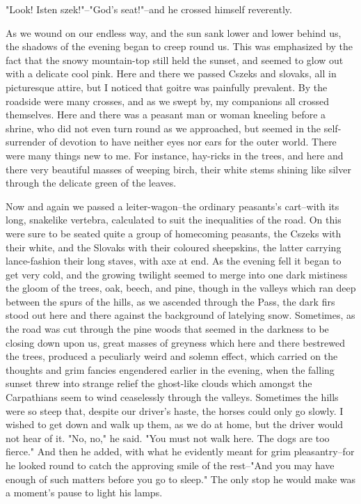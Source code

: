 "Look! Isten szek!"--"God's seat!"--and he crossed himself reverently. 

As we wound on our endless way, and the sun sank lower and lower behind us, the shadows of the evening began to creep round us. This was emphasized by the fact that the snowy mountain-top still held the sunset, and seemed to glow out with a delicate cool pink. Here and there we passed Cszeks and slovaks, all in picturesque attire, but I noticed that goitre was painfully prevalent. By the roadside were many crosses, and as we swept by, my companions all crossed themselves. Here and there was a peasant man or woman kneeling before a shrine, who did not even turn round as we approached, but seemed in the self-surrender of devotion to have neither eyes nor ears for the outer world. There were many things new to me. For instance, hay-ricks in the trees, and here and there very beautiful masses of weeping birch, their white stems shining like silver through the delicate green of the leaves. 

Now and again we passed a leiter-wagon--the ordinary peasants's cart--with its long, snakelike vertebra, calculated to suit the inequalities of the road. On this were sure to be seated quite a group of homecoming peasants, the Cszeks with their white, and the Slovaks with their coloured sheepskins, the latter carrying lance-fashion their long staves, with axe at end. As the evening fell it began to get very cold, and the growing twilight seemed to merge into one dark mistiness the gloom of the trees, oak, beech, and pine, though in the valleys which ran deep between the spurs of the hills, as we ascended through the Pass, the dark firs stood out here and there against the background of latelying snow. Sometimes, as the road was cut through the pine woods that seemed in the darkness to be closing down upon us, great masses of greyness which here and there bestrewed the trees, produced a peculiarly weird and solemn effect, which carried on the thoughts and grim fancies engendered earlier in the evening, when the falling sunset threw into strange relief the ghost-like clouds which amongst the Carpathians seem to wind ceaselessly through the valleys. Sometimes the hills were so steep that, despite our driver's haste, the horses could only go slowly. I wished to get down and walk up them, as we do at home, but the driver would not hear of it. "No, no," he said. "You must not walk here. The dogs are too fierce." And then he added, with what he evidently meant for grim pleasantry--for he looked round to catch the approving smile of the rest--"And you may have enough of such matters before you go to sleep." The only stop he would make was a moment's pause to light his lamps. 

